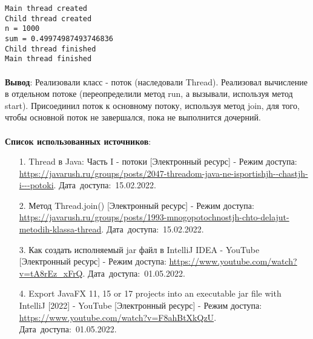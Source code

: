 \documentclass[12pt, a4paper, simple]{eskdtext}
\begin{document}
    \begin{lstlisting}[caption=Вывод в консоль]
Main thread created
Child thread created
n = 1000
sum = 0.49974987493746836
Child thread finished
Main thread finished
\end{lstlisting}

    \paragraph{} \textbf{Вывод}:
    Реализовали класс - поток (наследовали Thread).
    Реализовал вычисление в отдельном потоке (переопределили метод run, а вызывали, используя метод start).
    Присоединил поток к основному потоку, используя метод join, для того, чтобы основной поток не завершался, пока не выполнится дочерний.

    \paragraph{} \textbf{Список использованных источников}:
    \begin{enumerate}
        \item[1.] Thread в Java: Часть I - потоки [Электронный ресурс]
        - Режим доступа: \url{https://javarush.ru/groups/posts/2047-threadom-java-ne-isportishjh--chastjh-i---potoki}.
        Дата~доступа:~15.02.2022.
        \item[2.] Метод Thread.join() [Электронный ресурс]
        - Режим доступа: \url{https://javarush.ru/groups/posts/1993-mnogopotochnostjh-chto-delajut-metodih-klassa-thread}.
        Дата~доступа:~15.02.2022.
        \item[3.] Как создать исполняемый jar файл в IntelliJ IDEA - YouTube [Электронный ресурс]
        - Режим доступа: \url{https://www.youtube.com/watch?v=tA8rEz_xFrQ}.
        Дата~доступа:~01.05.2022.
        \item[4.] Export JavaFX 11, 15 or 17 projects into an executable jar file with IntelliJ [2022] - YouTube [Электронный ресурс]
        - Режим доступа: \url{https://www.youtube.com/watch?v=F8ahBtXkQzU}.
        Дата~доступа:~01.05.2022.
    \end{enumerate}
    \newpage
\end{document}

